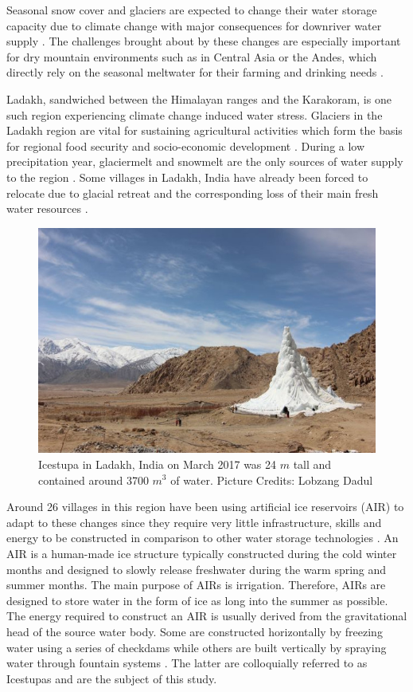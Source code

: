 \documentclass[utf8]{frontiersSCNS}
\begin{document}
Seasonal snow cover and glaciers are expected to change their water storage capacity due to climate
change with major consequences for downriver water supply \citep{Immerzeel_2020}. The challenges brought about
by these changes are especially important for dry mountain environments such as in Central Asia or the Andes,
which directly rely on the seasonal meltwater for their farming and drinking needs \citep{HoelzleBarandun_2019,
	Apel_2018, Buytaert_2017, Chen_2016, UNGERSHAYESTEH_2013}.

Ladakh, sandwiched between the Himalayan ranges and the Karakoram, is one such region experiencing climate
change induced water stress. Glaciers in the Ladakh region are vital for sustaining agricultural activities which
form the basis for regional food security and socio-economic development \citep{Labbal_2000, Schmidt_2012}.
During a low precipitation year, glaciermelt and snowmelt are the only sources of water supply to the region
\citep{Thayyen_2010}. Some villages in Ladakh, India have already been forced to relocate due to glacial retreat
and the corresponding loss of their main fresh water resources \citep{zanskar}.

\begin{figure}
	\begin{center}
		\includegraphics[width=10 cm]{Figures/Figure_1.jpg}
	\end{center}
	\caption{Icestupa in Ladakh, India on March 2017 was 24 $m$ tall and contained around 3700 $m^3$
		of water. Picture Credits: Lobzang Dadul}
	\label{fig:old_icestupa}
\end{figure}

Around 26 villages in this region have been using artificial ice reservoirs (AIR) to adapt to these changes since
they require very little infrastructure, skills and energy to be constructed in comparison to other water
storage technologies \citep{IPCC_2019,10.1659/MRD-JOURNAL-D-18-00072.1, campaign}. An AIR is a human-made ice
structure typically constructed during the cold winter months and designed to slowly release freshwater during
the warm spring and summer months.  The main purpose of AIRs is irrigation. Therefore, AIRs are designed to
store water in the form of ice as long into the summer as possible. The energy required to construct an AIR is
usually derived from the gravitational head of the source water body. Some are constructed horizontally by
freezing water using a series of checkdams while others are built vertically by spraying water through fountain
systems \citep{Nusser_2018}. The latter are colloquially referred to as Icestupas and are the subject of this
study.
\end{document}

